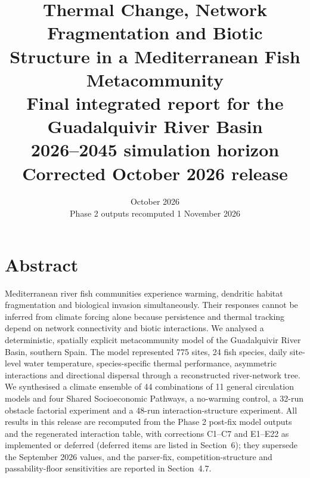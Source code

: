 \documentclass[11pt,a4paper]{article}
\title{\textbf{Thermal Change, Network Fragmentation and Biotic Structure in a Mediterranean Fish Metacommunity}\\
\vspace{0.15in}
Final integrated report for the Guadalquivir River Basin\\
2026--2045 simulation horizon\\
\vspace{0.10in}
\large Corrected October 2026 release}
\author{}
\date{October 2026\\[0.3em]\normalsize Phase 2 outputs recomputed 1 November 2026}
\begin{document}
\maketitle
\tableofcontents
\newpage

\section{Abstract}

Mediterranean river fish communities experience warming, dendritic habitat fragmentation and biological invasion simultaneously. Their responses cannot be inferred from climate forcing alone because persistence and thermal tracking depend on network connectivity and biotic interactions. We analysed a deterministic, spatially explicit metacommunity model of the Guadalquivir River Basin, southern Spain. The model represented 775 sites, 24 fish species, daily site-level water temperature, species-specific thermal performance, asymmetric interactions and directional dispersal through a reconstructed river-network tree. We synthesised a climate ensemble of 44 combinations of 11 general circulation models and four Shared Socioeconomic Pathways, a no-warming control, a 32-run obstacle factorial experiment and a 48-run interaction-structure experiment. All results in this release are recomputed from the Phase 2 post-fix model outputs and the regenerated interaction table, with corrections C1--C7 and E1--E22 as implemented or deferred (deferred items are listed in Section~6); they supersede the September 2026 values, and the parser-fix, competition-structure and passability-floor sensitivities are reported in Section~4.7.
\end{document}
